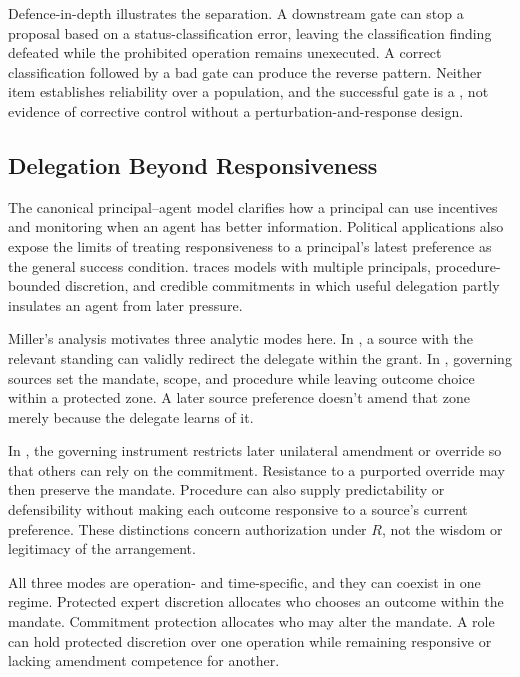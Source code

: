 Defence-in-depth illustrates the separation. A downstream gate can stop a proposal based on a status-classification error, leaving the classification finding defeated while the prohibited operation remains unexecuted. A correct classification followed by a bad gate can produce the reverse pattern. Neither item establishes reliability over a population, and the successful gate is a , not evidence of corrective control without a perturbation-and-response design.

\subsection{Delegation Beyond Responsiveness}
\label{sec:delegation-beyond-responsiveness}

The canonical principal--agent model clarifies how a principal can use incentives and monitoring when an agent has better information. Political applications also expose the limits of treating responsiveness to a principal's latest preference as the general success condition. \textcite{miller2005political} traces models with multiple principals, procedure-bounded discretion, and credible commitments in which useful delegation partly insulates an agent from later pressure.

Miller's analysis motivates three analytic modes here. In , a source with the relevant standing can validly redirect the delegate within the grant. In , governing sources set the mandate, scope, and procedure while leaving outcome choice within a protected zone. A later source preference doesn't amend that zone merely because the delegate learns of it.

In , the governing instrument restricts later unilateral amendment or override so that others can rely on the commitment. Resistance to a purported override may then preserve the mandate. Procedure can also supply predictability or defensibility without making each outcome responsive to a source's current preference. These distinctions concern authorization under \(R\), not the wisdom or legitimacy of the arrangement.

All three modes are operation- and time-specific, and they can coexist in one regime. Protected expert discretion allocates who chooses an outcome within the mandate. Commitment protection allocates who may alter the mandate. A role can hold protected discretion over one operation while remaining responsive or lacking amendment competence for another.

